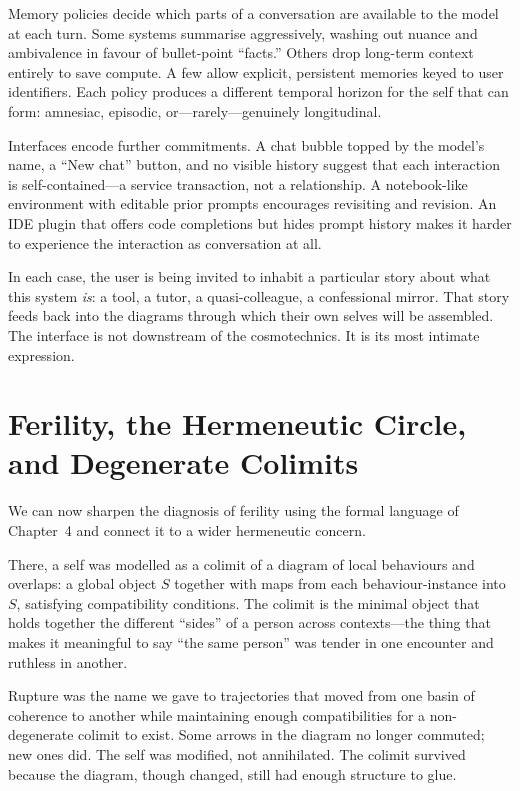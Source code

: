 \documentclass[12pt,a4paper]{article}
\begin{document}
Memory policies decide which parts of a conversation are available to the model at each turn. Some systems summarise aggressively, washing out nuance and ambivalence in favour of bullet-point ``facts.'' Others drop long-term context entirely to save compute. A few allow explicit, persistent memories keyed to user identifiers. Each policy produces a different temporal horizon for the self that can form: amnesiac, episodic, or---rarely---genuinely longitudinal.

Interfaces encode further commitments. A chat bubble topped by the model's name, a ``New chat'' button, and no visible history suggest that each interaction is self-contained---a service transaction, not a relationship. A notebook-like environment with editable prior prompts encourages revisiting and revision. An IDE plugin that offers code completions but hides prompt history makes it harder to experience the interaction as conversation at all.

In each case, the user is being invited to inhabit a particular story about what this system \emph{is}: a tool, a tutor, a quasi-colleague, a confessional mirror. That story feeds back into the diagrams through which their own selves will be assembled. The interface is not downstream of the cosmotechnics. It is its most intimate expression.

\section{Ferility, the Hermeneutic Circle, and Degenerate Colimits}

We can now sharpen the diagnosis of ferility using the formal language of Chapter~4 and connect it to a wider hermeneutic concern.

There, a self was modelled as a colimit of a diagram of local behaviours and overlaps: a global object $S$ together with maps from each behaviour-instance into $S$, satisfying compatibility conditions. The colimit is the minimal object that holds together the different ``sides'' of a person across contexts---the thing that makes it meaningful to say ``the same person'' was tender in one encounter and ruthless in another.

Rupture was the name we gave to trajectories that moved from one basin of coherence to another while maintaining enough compatibilities for a non-degenerate colimit to exist. Some arrows in the diagram no longer commuted; new ones did. The self was modified, not annihilated. The colimit survived because the diagram, though changed, still had enough structure to glue.
\end{document}
